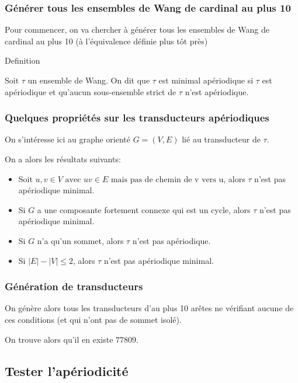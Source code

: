 \documentclass{beamer}
\renewcommand{\le}{\leqslant}
\begin{document}
\begin{frame}

\frametitle{Générer tous les ensembles de Wang de cardinal au plus 10}

Pour commencer, on va chercher à générer tous les ensembles de Wang de cardinal au plus 10 (à l'équivalence définie plus tôt près)

\begin{alertblock}{Definition}

Soit $\tau$ un ensemble de Wang. On dit que $\tau$ est minimal apériodique si $\tau$ est apériodique
et qu'aucun sous-ensemble strict de $\tau$ n'est apériodique.
    
\end{alertblock}
    
\end{frame}

\begin{frame}
\frametitle{Quelques propriétés sur les transducteurs apériodiques}

On s'intéresse ici au graphe orienté $G = (V,E)$ lié au transducteur de $\tau$.

On a alors les résultats suivants:

\begin{itemize}
    \item Soit $u,v \in V \text{ avec } uv \in E \text{ mais pas de chemin de v vers u}$, alors $\tau$ n'est pas apériodique minimal.
    \item Si $G$ a une composante fortement connexe qui est un cycle, alors $\tau$ n'est pas apériodique minimal.
    \item Si $G$ n'a qu'un sommet, alors $\tau$ n'est pas apériodique.
    \item Si $|E|-|V| \le 2$, alors $\tau$ n'est pas apériodique minimal.
\end{itemize}

\end{frame}

\begin{frame}
\frametitle{Génération de transducteurs}

On génère alors tous les transducteurs d'au plus 10 arêtes ne vérifiant aucune de ces conditions (et qui n'ont pas de sommet isolé).

On trouve alors qu'il en existe $77809$.

\end{frame}

\subsection{Tester l'apériodicité}
\end{document}
